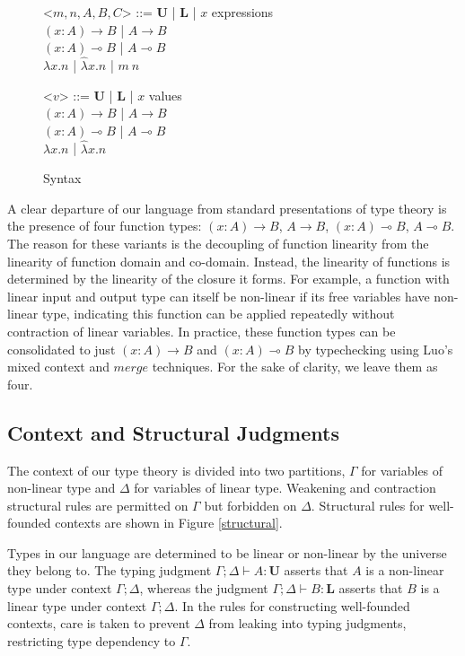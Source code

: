 \documentclass{article}
\newcommand{\indalt}[1][2]{\\\hspace*{-1.2em}\textbar\quad}
\newcommand{\U}{\textbf{U}}
\renewcommand{\L}{\textbf{L}}
\newcommand{\lambdah}{\hat{\lambda}}
\begin{document}
  \begin{figure}[h]
    \caption{Syntax}
    \centering
    \begin{minipage}{0.8\linewidth}
    \begin{grammar}
      <$m, n, A, B, C$> ::= $\U$ | $\L$ | $x$  \hspace*{8em} expressions
      \indalt $(x : A) \rightarrow B$ | $A \rightarrow B$
      \indalt $(x : A) \multimap B$ | $A \multimap B$
      \indalt $\lambda x. n$ | $\lambdah x.n$ | $m\ n$

      <$v$> ::= $\U$ | $\L$ | $x$ \hspace*{8em} values
      \indalt $(x : A) \rightarrow B$ | $A \rightarrow B$
      \indalt $(x : A) \multimap B$ | $A \multimap B$
      \indalt $\lambda x. n$ | $\lambdah x.n$
    \end{grammar}
    \end{minipage}
    \label{syntax}
  \end{figure}

  A clear departure of our language from standard presentations of type theory is the presence of four function types: $(x : A) \rightarrow B$, $A \rightarrow B$, $(x : A) \multimap B$, $A \multimap B$. The reason for these variants is the decoupling of function linearity from the linearity of function domain and co-domain. Instead, the linearity of functions is determined by the linearity of the closure it forms. For example, a function with linear input and output type can itself be non-linear if its free variables have non-linear type, indicating this function can be applied repeatedly without contraction of linear variables. In practice, these function types can be consolidated to just $(x : A) \rightarrow B$ and $(x : A) \multimap B$ by typechecking using Luo's mixed context and $merge$ techniques. For the sake of clarity, we leave them as four.

  \subsection{Context and Structural Judgments}
  The context of our type theory is divided into two partitions, $\Gamma$ for variables of non-linear type and $\Delta$ for variables of linear type. Weakening and contraction structural rules are permitted on $\Gamma$ but forbidden on $\Delta$. Structural rules for well-founded contexts are shown in Figure \ref{structural}. 

  Types in our language are determined to be linear or non-linear by the universe they belong to. The typing judgment $\Gamma; \Delta \vdash A : \U$ asserts that $A$ is a non-linear type under context $\Gamma; \Delta$, whereas the judgment $\Gamma; \Delta \vdash B : \L$ asserts that $B$ is a linear type under context $\Gamma; \Delta$. In the rules for constructing well-founded contexts, care is taken to prevent $\Delta$ from leaking into typing judgments, restricting type dependency to $\Gamma$.
  
\end{document}
